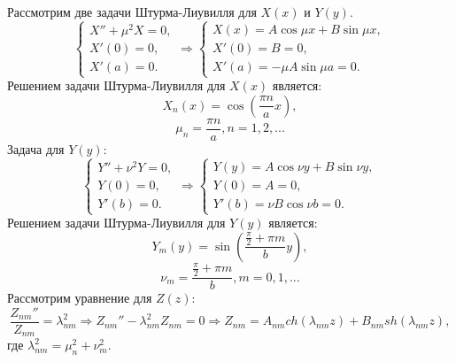 \documentclass[11pt]{article}
\begin{document}
Рассмотрим две задачи Штурма-Лиувилля для $X(x)$ и $Y(y)$.
$$\begin{cases}
    X''+\mu^2X=0,\\
    X'(0)=0,\\
    X'(a)=0.
\end{cases} \Rightarrow
\begin{cases}
    X(x)=A\cos{\mu x}+B\sin{\mu x},\\
    X'(0)=B=0,\\
    X'(a)=-\mu A\sin{\mu a}=0.
\end{cases}$$
Решением задачи Штурма-Лиувилля для $X(x)$ является:
$$X_n(x)=\cos{(\frac{\pi n}{a}x)},$$
$$\mu_n=\frac{\pi n}{a}, n = 1,2,...$$
Задача для $Y(y)$:
$$\begin{cases}
    Y''+\nu^2Y=0,\\
    Y(0)=0,\\
    Y'(b)=0.
\end{cases} \Rightarrow
\begin{cases}
    Y(y)=A\cos{\nu y}+B\sin{\nu y},\\
    Y(0)=A=0,\\
    Y'(b)=\nu B\cos{\nu b}=0.
\end{cases}$$
Решением задачи Штурма-Лиувилля для $Y(y)$ является:
$$Y_m(y)=\sin{(\frac{\frac{\pi}{2}+\pi m}{b}y)},$$
$$\nu_m=\frac{\frac{\pi}{2}+\pi m}{b}, m = 0,1,...$$
Рассмотрим уравнение для $Z(z)$:
$$\frac{Z_{nm}''}{Z_{nm}}=\lambda_{nm}^2\Rightarrow Z_{nm}''-\lambda_{nm}^2Z_{nm}=0\Rightarrow Z_{nm}=A_{nm}ch(\lambda_{nm}z)+B_{nm}sh(\lambda_{nm}z),$$
где $\lambda_{nm}^2=\mu_n^2+\nu_m^2.$
\end{document}
